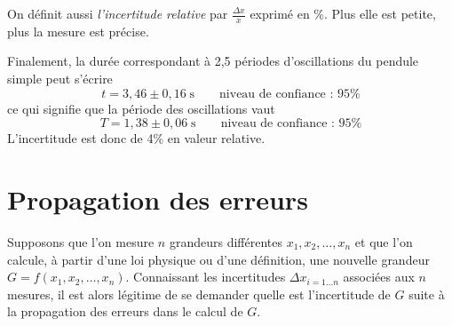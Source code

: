 On définit aussi \emph{l'incertitude relative} par \(\frac{\Delta x}{x}\) exprimé en \%. Plus elle est petite, plus la mesure est précise.

\begin{kaoexample}[frametitle=Expérience]
Finalement, la durée correspondant à 2,5 périodes d'oscillations du pendule simple peut s'écrire 
\[	t=3,46\pm 0,16 \;\mathrm{s}\qquad \text{niveau de confiance : 95\%}\]
ce qui signifie que la période des oscillations vaut 
\[T=1,38\pm 0,06\;\mathrm{s}\qquad \text{niveau de confiance : 95\%}\]
L'incertitude est donc de 4\% en valeur relative.
\end{kaoexample} 


\section{Propagation des erreurs}%
Supposons que l'on mesure $n$ grandeurs différentes $x_1,x_2,\ldots,x_n$ et que l'on calcule, à partir d'une loi physique ou d'une définition, une nouvelle grandeur $G=f(x_1,x_2,\ldots,x_n)$. Connaissant les incertitudes  $\Delta x_{i=1\ldots n}$ associées aux $n$ mesures, il est alors légitime de se demander quelle est l'incertitude de $G$ suite à la propagation des erreurs dans le calcul de $G$.  

